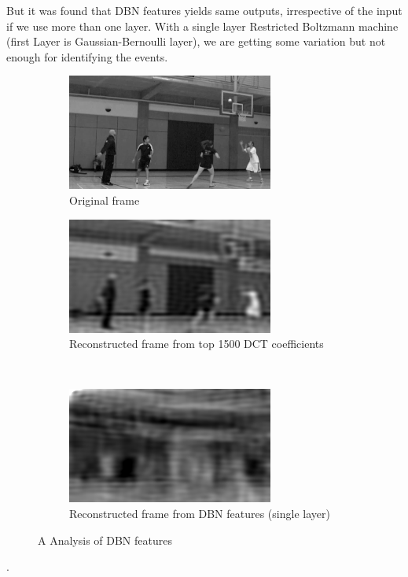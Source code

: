 But it was found that DBN features yields same outputs, irrespective of the input if we use more than one layer. With a single layer Restricted Boltzmann machine (first Layer is Gaussian-Bernoulli layer), we are getting some variation but not enough for identifying the events.\\


\begin{figure}
        \centering
        \begin{subfigure}[b]{\textwidth}
        			\centering
                \includegraphics[scale=1]{./imgs/Original.png}
                \caption{Original frame}
                \label{fig:original}
        \end{subfigure}%
        
        \begin{subfigure}[b]{0.45\textwidth}
        		\centering
        		\includegraphics[scale=1]{./imgs/DCT.png}
        		\caption{Reconstructed frame from top 1500 DCT coefficients}
        		\label{fig:dct}
        \end{subfigure}
        ~%
        \begin{subfigure}[b]{0.45\textwidth}
        			\centering
                \includegraphics[scale=1]{./imgs/DBN.png}
                \caption{Reconstructed frame from DBN features (single layer)}
                \label{fig:dbn}
        \end{subfigure}
        \caption{ A Analysis of DBN features}
        \label{fig:dct+dbn}
\end{figure}.


